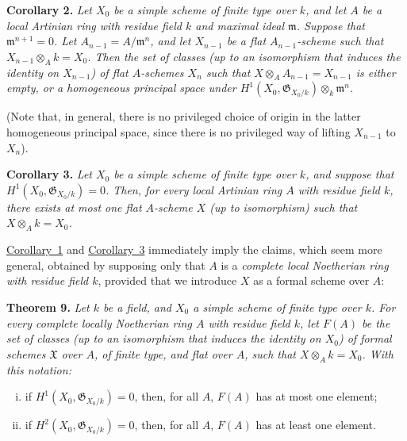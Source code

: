 \documentclass{article}
\newenvironment{itenv}[1]
  {\phantomsection\par\medskip\noindent\textbf{#1.}\itshape}
  {\medskip}
\newcommand{\fk}{\mathfrak}
\newcommand{\oldpage}[1]{\marginpar{\footnotesize$\Big\vert$ \textit{p.~#1}}}
\begin{document}
\begin{itenv}{Corollary 2}
\label{theorem8corollary2}
  Let $X_0$ be a simple scheme of finite type over $k$, and let $A$ be a local Artinian ring with residue field $k$ and maximal ideal $\fk{m}$.
  Suppose that $\fk{m}^{n+1}=0$.
  Let $A_{n-1}=A/\fk{m}^n$, and let $X_{n-1}$ be a flat $A_{n-1}$-scheme such that $X_{n-1}\otimes_Ak=X_0$.
  Then the set of classes (up to an isomorphism that induces the identity on $X_{n-1}$) of flat $A$-schemes $X_n$ such that $X\otimes_AA_{n-1}=X_{n-1}$ is either empty, or a homogeneous principal space under $H^1(X_0,\fk{G}_{X_0/k})\otimes_k\fk{m}^n$.
\end{itenv}

(Note that, in general, there is no privileged choice of origin in the latter homogeneous principal space, since there is no privileged way of lifting $X_{n-1}$ to $X_n$).

\begin{itenv}{Corollary 3}
\label{theorem8corollary3}
  Let $X_0$ be a simple scheme of finite type over $k$, and suppose that $H^1(X_0,\fk{G}_{X_0/k})=0$.
  Then, for every local Artinian ring $A$ with residue field $k$, \emph{there exists at most one flat $A$-scheme $X$} (up to isomorphism) such that $X\otimes_Ak=X_0$.
\end{itenv}

\hyperref[theorem8corollary1]{Corollary~1} and \hyperref[theorem8corollary3]{Corollary~3} immediately imply the claims, which seem more general, obtained by supposing only that $A$ is a \emph{complete local Noetherian ring with residue field $k$}, provided that we introduce $X$ as a formal scheme over $A$:

\begin{itenv}{Theorem 9}
\label{theorem9}
  Let $k$ be a field, and $X_0$ a \emph{simple} scheme of finite type over $k$.
  For every complete locally Noetherian ring $A$ with residue field $k$, let $F(A)$ be the set of classes (up to an isomorphism that induces the identity on $X_0$)
\oldpage{182-14}
  of formal schemes $\fk{X}$ over $A$, of finite type, and flat over $A$, such that $X\otimes_Ak=X_0$.
  With this notation:
  \begin{enumerate}[i.]
    \item if $H^1(X_0,\fk{G}_{X_0/k})=0$, then, for all $A$, $F(A)$ has at most one element;
    \item if $H^2(X_0,\fk{G}_{X_0/k})=0$, then, for all $A$, $F(A)$ has at least one element.
  \end{enumerate}
\end{itenv}
\end{document}
